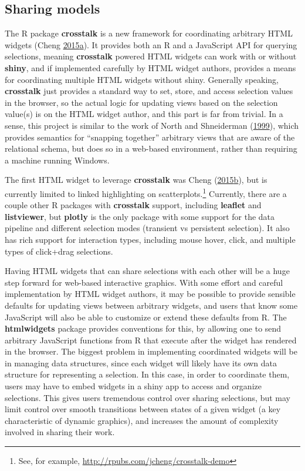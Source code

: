 \documentclass[12pt,]{isuthesis}
\let\rmarkdownfootnote\footnote%
\def\footnote{\protect\rmarkdownfootnote}
\begin{document}
\subsection{Sharing models}\label{sharing-models}

The R package \textbf{crosstalk} is a new framework for coordinating
arbitrary HTML widgets (Cheng
\protect\hyperlink{ref-crosstalk}{2015}\protect\hyperlink{ref-crosstalk}{a}).
It provides both an R and a JavaScript API for querying selections,
meaning \textbf{crosstalk} powered HTML widgets can work with or without
\textbf{shiny}, and if implemented carefully by HTML widget authors,
provides a means for coordinating multiple HTML widgets without shiny.
Generally speaking, \textbf{crosstalk} just provides a standard way to
set, store, and access selection values in the browser, so the actual
logic for updating views based on the selection value(s) is on the HTML
widget author, and this part is far from trivial. In a sense, this
project is similar to the work of North and Shneiderman
(\protect\hyperlink{ref-North:1999vi}{1999}), which provides semantics
for ``snapping together'' arbitrary views that are aware of the
relational schema, but does so in a web-based environment, rather than
requiring a machine running Windows.

The first HTML widget to leverage \textbf{crosstalk} was Cheng
(\protect\hyperlink{ref-d3scatter}{2015}\protect\hyperlink{ref-d3scatter}{b}),
but is currently limited to linked highlighting on
scatterplots.\footnote{See, for example,
  \url{http://rpubs.com/jcheng/crosstalk-demo}} Currently, there are a
couple other R packages with \textbf{crosstalk} support, including
\textbf{leaflet} and \textbf{listviewer}, but \textbf{plotly} is the
only package with some support for the data pipeline and different
selection modes (transient vs persistent selection). It also has rich
support for interaction types, including mouse hover, click, and
multiple types of click+drag selections.

Having HTML widgets that can share selections with each other will be a
huge step forward for web-based interactive graphics. With some effort
and careful implementation by HTML widget authors, it may be possible to
provide sensible defaults for updating views between arbitrary widgets,
and users that know some JavaScript will also be able to customize or
extend these defaults from R. The \textbf{htmlwidgets} package provides
conventions for this, by allowing one to send arbitrary JavaScript
functions from R that execute after the widget has rendered in the
browser. The biggest problem in implementing coordinated widgets will be
in managing data structures, since each widget will likely have its own
data structure for representing a selection. In this case, in order to
coordinate them, users may have to embed widgets in a shiny app to
access and organize selections. This gives users tremendous control over
sharing selections, but may limit control over smooth transitions
between states of a given widget (a key characteristic of dynamic
graphics), and increases the amount of complexity involved in sharing
their work.
\end{document}
